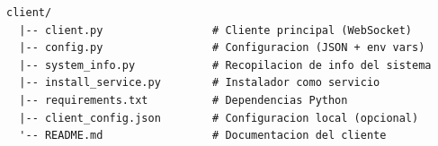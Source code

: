 \documentclass[12pt,a4paper]{article}
\begin{document}
\begin{lstlisting}[language={},title={Estructura del directorio client/}]
client/
  |-- client.py                 # Cliente principal (WebSocket)
  |-- config.py                 # Configuracion (JSON + env vars)
  |-- system_info.py            # Recopilacion de info del sistema
  |-- install_service.py        # Instalador como servicio
  |-- requirements.txt          # Dependencias Python
  |-- client_config.json        # Configuracion local (opcional)
  '-- README.md                 # Documentacion del cliente
\end{lstlisting}
\end{document}
